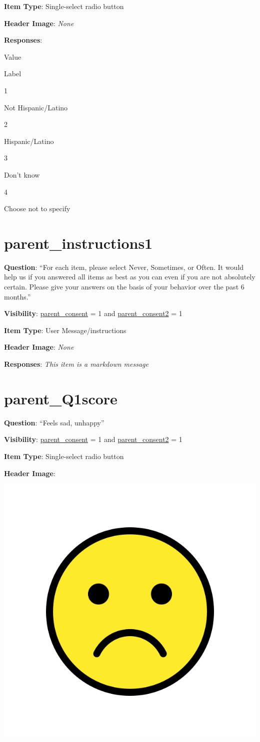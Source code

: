 \documentclass[]{book}
\begin{document}
\textbf{Item Type}: Single-select radio button

\textbf{Header Image}: \emph{None}

\textbf{Responses}:

Value

Label

1

Not Hispanic/Latino

2

Hispanic/Latino

3

Don't know

4

Choose not to specify

\hypertarget{parent_instructions1}{%
\section{parent\_instructions1}\label{parent_instructions1}}

\textbf{Question}: ``For each item, please select Never, Sometimes, or Often. It would help us if you answered all items as best as you can even if you are not absolutely certain. Please give your answers on the basis of your behavior over the past 6 months.''

\textbf{Visibility}: \protect\hyperlink{parent_consent}{parent\_consent} = 1 and \protect\hyperlink{parent_consent2}{parent\_consent2} = 1

\textbf{Item Type}: User Message/instructions

\textbf{Header Image}: \emph{None}

\textbf{Responses}: \emph{This item is a markdown message}

\hypertarget{parent_q1score}{%
\section{parent\_Q1score}\label{parent_q1score}}

\textbf{Question}: ``Feels sad, unhappy''

\textbf{Visibility}: \protect\hyperlink{parent_consent}{parent\_consent} = 1 and \protect\hyperlink{parent_consent2}{parent\_consent2} = 1

\textbf{Item Type}: Single-select radio button

\textbf{Header Image}:

\begin{flushleft}\includegraphics[width=0.33\linewidth]{downloadFigs4latex_HBN_PMHS_Codebook/parent_Q1score_headerImg} \end{flushleft}
\end{document}
